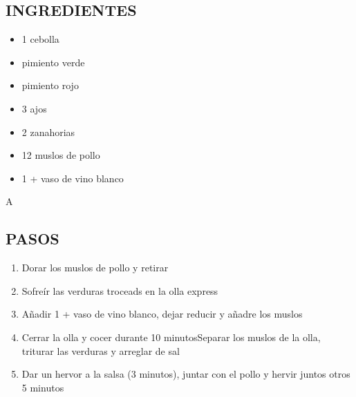 
\subsection*{INGREDIENTES}
\begin{itemize}
    \item 1 cebolla
    \item {} pimiento verde
    \item {} pimiento rojo
    \item 3 ajos
    \item 2 zanahorias
    \item 12 muslos de pollo
    \item 1 +  vaso de vino blanco

\end{itemize}A

\subsection*{PASOS}
\begin{enumerate}
    \item Dorar los muslos de pollo y retirar
    \item Sofreír las verduras troceads en la olla express
    \item Añadir 1 +  vaso de vino blanco, dejar reducir y añadre los muslos
    \item Cerrar la olla y cocer durante 10 minutosSeparar los muslos de la olla, triturar las verduras y arreglar de sal
    \item Dar un hervor a la salsa (3 minutos), juntar con el pollo y hervir juntos otros 5 minutos
\end{enumerate}
